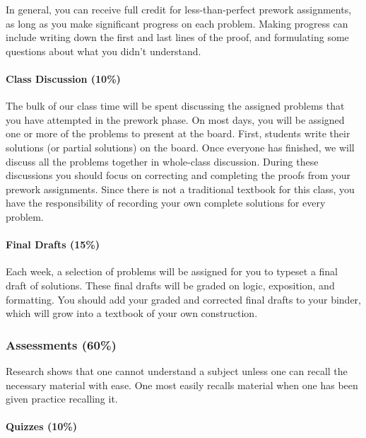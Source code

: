 \documentclass[
  twoside]{article}
\begin{document}
In general, you can receive full credit for less-than-perfect prework
assignments, as long as you make significant progress on each problem.
Making progress can include writing down the first and last lines of the
proof, and formulating some questions about what you didn't understand.

\paragraph{Class Discussion (10\%)}\label{class-discussion-10}

The bulk of our class time will be spent discussing the assigned
problems that you have attempted in the prework phase. On most days, you
will be assigned one or more of the problems to present at the board.
First, students write their solutions (or partial solutions) on the
board. Once everyone has finished, we will discuss all the problems
together in whole-class discussion. During these discussions you should
focus on correcting and completing the proofs from your prework
assignments. Since there is not a traditional textbook for this class,
you have the responsibility of recording your own complete solutions for
every problem.

\paragraph{Final Drafts (15\%)}\label{final-drafts-15}

Each week, a selection of problems will be assigned for you to typeset a
final draft of solutions. These final drafts will be graded on logic,
exposition, and formatting. You should add your graded and corrected
final drafts to your binder, which will grow into a textbook of your own
construction.

\subsubsection{Assessments (60\%)}\label{assessments-60}

Research shows that one cannot understand a subject unless one can
recall the necessary material with ease. One most easily recalls
material when one has been given practice recalling it.

\paragraph{Quizzes (10\%)}\label{quizzes-10}
\end{document}
